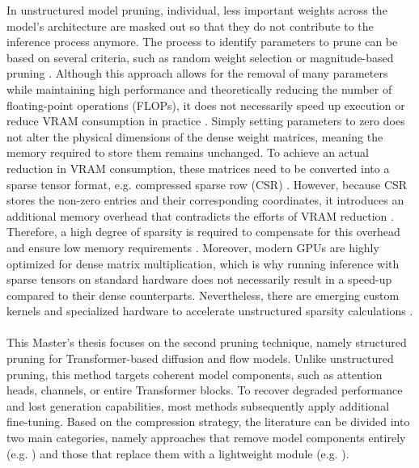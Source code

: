  In unstructured model pruning, individual, less important weights across the model's architecture are masked out so that they do not contribute to the inference process anymore. The process to identify parameters to prune can be based on several criteria, such as random weight selection \cite{liu2022unreasonable} or magnitude-based pruning \cite{han2015deep,frankle2018lottery}. Although this approach allows for the removal of many parameters while maintaining high performance and theoretically reducing the number of floating-point operations (FLOPs), it does not necessarily speed up execution or reduce \gls{VRAM} consumption in practice \cite{wen2016learning,gale2020sparse,ma2018shufflenet}. Simply setting parameters to zero does not alter the physical dimensions of the dense weight matrices, meaning the memory required to store them remains unchanged. To achieve an actual reduction in \gls{VRAM} consumption, these matrices need to be converted into a sparse tensor format, e.g. compressed sparse row (CSR) \cite{bell2008efficient}. However, because CSR stores the non-zero entries and their corresponding coordinates, it introduces an additional memory overhead that contradicts the efforts of \gls{VRAM} reduction \cite{hoefler2021sparsity}. Therefore, a high degree of sparsity is required to compensate for this overhead and ensure low memory requirements \cite{wen2016learning}. Moreover, modern GPUs are highly optimized for dense matrix multiplication, which is why running inference with sparse tensors on standard hardware does not necessarily result in a speed-up compared to their dense counterparts. Nevertheless, there are emerging custom kernels and specialized hardware to accelerate unstructured sparsity calculations \cite{gale2020sparse}. 
\\\\
 This Master's thesis focuses on the second pruning technique, namely structured pruning for Transformer-based diffusion and flow models. Unlike unstructured pruning, this method targets coherent model components, such as attention heads, channels, or entire Transformer blocks. To recover degraded performance and lost generation capabilities, most methods subsequently apply additional fine-tuning.
 Based on the compression strategy, the literature can be divided into two main categories, namely approaches that remove model components entirely (e.g. \cite{Bksdm, flux1-lite}) and those that replace them with a lightweight module (e.g. \cite{FastFlux,PPCL}).  
 

